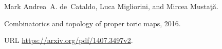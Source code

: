 Mark Andrea~A. de~Cataldo, Luca Migliorini, and Mircea Musta\c{t}\u{a}.

\newblock Combinatorics and topology of proper toric maps, 2016.

\newblock URL \url{https://arxiv.org/pdf/1407.3497v2}.

